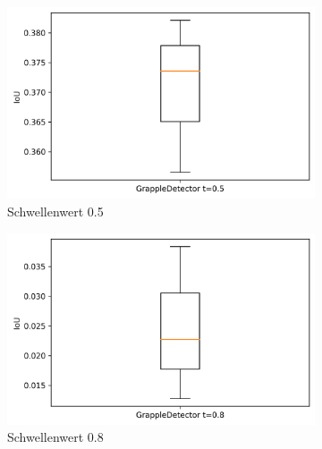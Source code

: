     \begin{figure}[h]
    	\centering
    	\begin{subfigure}[c]{0.29\textwidth}			
    		\includegraphics[width=1\textwidth,center]{bilder/Hauptteil/Autoencoder_Grappel_Detection/IoU_05_AE_Grapple.png}
    		\caption{Schwellenwert 0.5}
    		\label{img:BoxPlot_RegressionAufAutoencoder05}	
    	\end{subfigure}
    	\centering
    \begin{subfigure}[c]{0.29\textwidth}			
    	\includegraphics[width=1\textwidth,center]{bilder/Hauptteil/Autoencoder_Grappel_Detection/IoU_08_AE_Grapple.png}
    	\caption{Schwellenwert 0.8}
    	\label{img:BoxPlot_RegressionAufAutoencoder08}	
    \end{subfigure}
    	\begin{subfigure}[c]{0.29\textwidth}			

\end{subfigure}
\end{figure}
